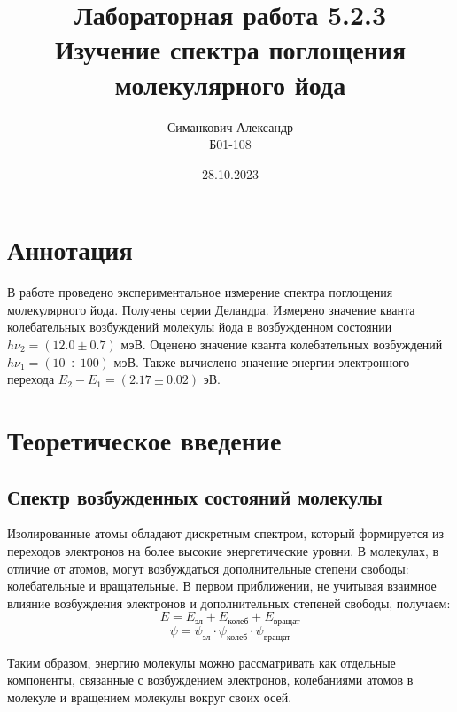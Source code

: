 \documentclass[12pt,a4paper]{article}
\title{Лабораторная работа 5.2.3 \\ Изучение спектра поглощения молекулярного йода}
\author{Симанкович Александр\\ Б01-108}
\date{28.10.2023}
\begin{document}
	\maketitle
	
	\section*{Аннотация}
	
	В работе проведено экспериментальное измерение спектра поглощения молекулярного йода. Получены серии Деландра. Измерено значение кванта колебательных возбуждений молекулы йода в возбужденном состоянии $h \nu_2 = (12.0 \pm 0.7) \text{ мэВ}.$ Оценено значение кванта колебательных возбуждений $ h \nu_1 = (10 \div 100) \text{ мэВ}$. Также вычислено значение энергии электронного перехода $E_2 - E_1 = (2.17 \pm 0.02) \text{ эВ}.$
	
	
	\section*{Теоретическое введение}
	
	\subsection*{Спектр возбужденных состояний молекулы}
	
	Изолированные атомы обладают дискретным спектром, который формируется из переходов электронов на более высокие энергетические уровни. В молекулах, в отличие от атомов, могут возбуждаться дополнительные степени свободы: колебательные и вращательные. В первом приближении, не учитывая взаимное влияние возбуждения электронов и дополнительных степеней свободы, получаем:
	$$ E = E_{\text{эл}} + E_{\text{колеб}} + E_{\text{вращат}}$$
	$$ \psi = \psi_{\text{эл}} \cdot \psi_{\text{колеб}} \cdot \psi_{\text{вращат}} $$
	
	Таким образом, энергию молекулы можно рассматривать как отдельные компоненты, связанные с возбуждением электронов, колебаниями атомов в молекуле и вращением молекулы вокруг своих осей.
\end{document}
